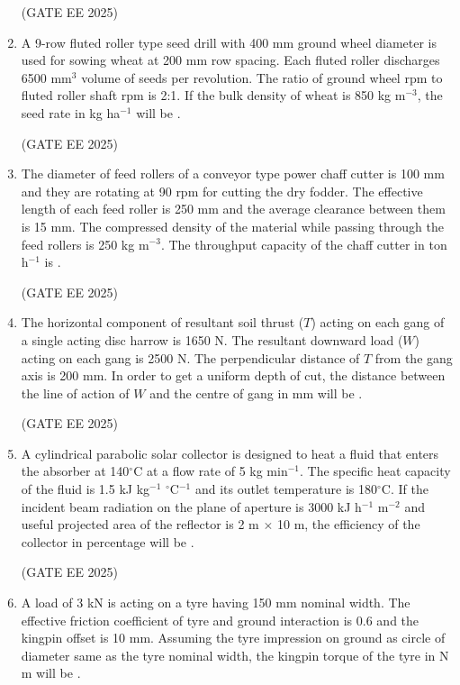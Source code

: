 \documentclass[journal,12pt,onecolumn]{IEEEtran}
\theoremstyle{remark}
\begin{document}
\begin{enumerate}
\hfill(GATE EE 2025)

\item A 9-row fluted roller type seed drill with 400 mm ground wheel diameter is used for sowing wheat at 200 mm row spacing. Each fluted roller discharges 6500 mm$^{3}$ volume of seeds per revolution. The ratio of ground wheel rpm to fluted roller shaft rpm is 2:1. If the bulk density of wheat is 850 kg m$^{-3}$, the seed rate in kg ha$^{-1}$ will be \underline{\hspace{2cm}}.

\hfill(GATE EE 2025)

\item The diameter of feed rollers of a conveyor type power chaff cutter is 100 mm and they are rotating at 90 rpm for cutting the dry fodder. The effective length of each feed roller is 250 mm and the average clearance between them is 15 mm. The compressed density of the material while passing through the feed rollers is 250 kg m$^{-3}$. The throughput capacity of the chaff cutter in ton h$^{-1}$ is \underline{\hspace{2cm}}. 

\hfill(GATE EE 2025)

\item The horizontal component of resultant soil thrust ($T$) acting on each gang of a single acting disc harrow is 1650 N. The resultant downward load ($W$) acting on each gang is 2500 N. The perpendicular distance of $T$ from the gang axis is 200 mm. In order to get a uniform depth of cut, the distance between the line of action of $W$ and the centre of gang in mm will be \underline{\hspace{2cm}}. 

\hfill(GATE EE 2025)

\item A cylindrical parabolic solar collector is designed to heat a fluid that enters the absorber at 140$^\circ$C at a flow rate of 5 kg min$^{-1}$. The specific heat capacity of the fluid is 1.5 kJ kg$^{-1}$ $^\circ$C$^{-1}$ and its outlet temperature is 180$^\circ$C. If the incident beam radiation on the plane of aperture is 3000 kJ h$^{-1}$ m$^{-2}$ and useful projected area of the reflector is 2 m $\times$ 10 m, the efficiency of the collector in percentage will be \underline{\hspace{2cm}}.

\hfill(GATE EE 2025)

\item A load of 3 kN is acting on a tyre having 150 mm nominal width. The effective friction coefficient of tyre and ground interaction is 0.6 and the kingpin offset is 10 mm. Assuming the tyre impression on ground as circle of diameter same as the tyre nominal width, the kingpin torque of the tyre in N m will be \underline{\hspace{2cm}}. 


\end{enumerate}
\end{document}
